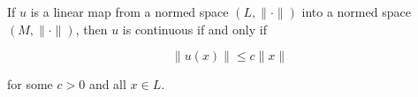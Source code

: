 If $u$ is a linear map from a normed space $(L, \|\cdot\|)$ into a normed space $(M, \|\cdot\|)$, then $u$ is continuous if and only if

$$\|u(x)\| \leq c \|x\|$$

for some $c > 0$ and all $x \in L$.
